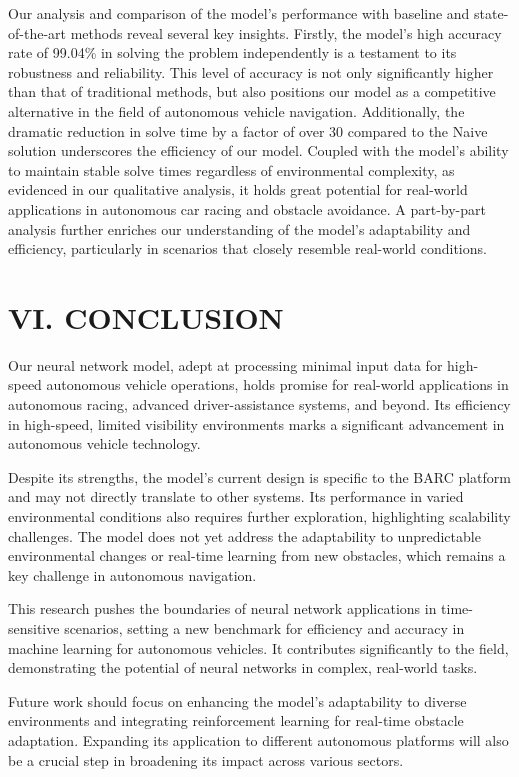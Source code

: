 \documentclass[
	letterpaper, %
	10pt, %
	unnumberedsections, %
	twoside, %
]{LTJournalArticle}
\begin{document}
Our analysis and comparison of the model's performance with baseline and state-of-the-art methods reveal several key insights. Firstly, the model's high accuracy rate of 99.04\% in solving the problem independently is a testament to its robustness and reliability. This level of accuracy is not only significantly higher than that of traditional methods, but also positions our model as a competitive alternative in the field of autonomous vehicle navigation. Additionally, the dramatic reduction in solve time by a factor of over 30 compared to the Naive solution underscores the efficiency of our model. Coupled with the model's ability to maintain stable solve times regardless of environmental complexity, as evidenced in our qualitative analysis, it holds great potential for real-world applications in autonomous car racing and obstacle avoidance. A part-by-part analysis further enriches our understanding of the model's adaptability and efficiency, particularly in scenarios that closely resemble real-world conditions.

\section{VI. CONCLUSION}

\quad Our neural network model, adept at processing minimal input data for high-speed autonomous vehicle operations, holds promise for real-world applications in autonomous racing, advanced driver-assistance systems, and beyond. Its efficiency in high-speed, limited visibility environments marks a significant advancement in autonomous vehicle technology.

Despite its strengths, the model's current design is specific to the BARC platform and may not directly translate to other systems. Its performance in varied environmental conditions also requires further exploration, highlighting scalability challenges. The model does not yet address the adaptability to unpredictable environmental changes or real-time learning from new obstacles, which remains a key challenge in autonomous navigation.

This research pushes the boundaries of neural network applications in time-sensitive scenarios, setting a new benchmark for efficiency and accuracy in machine learning for autonomous vehicles. It contributes significantly to the field, demonstrating the potential of neural networks in complex, real-world tasks.

Future work should focus on enhancing the model's adaptability to diverse environments and integrating reinforcement learning for real-time obstacle adaptation. Expanding its application to different autonomous platforms will also be a crucial step in broadening its impact across various sectors.
\end{document}
